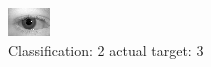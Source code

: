 \begin{figure}[h!]
\begin{center}
\includegraphics[width=0.60\columnwidth]{figures/ID536_class_2_target_3.png}
\end{center}
\caption{ Classification: 2 actual target: 3}
\label{fig:ID536_class_2_target_3}
\end{figure}
